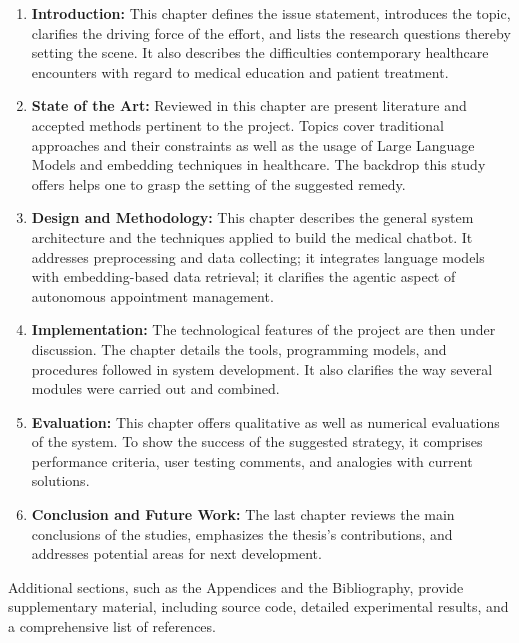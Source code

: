 \begin{enumerate}[itemsep=2em]
    \item \textbf{Introduction:} This chapter defines the issue statement, introduces the topic, clarifies the driving force of the effort, and lists the research questions thereby setting the scene. It also describes the difficulties contemporary healthcare encounters with regard to medical education and patient treatment.
    
    \item \textbf{State of the Art:} Reviewed in this chapter are present literature and accepted methods pertinent to the project. Topics cover traditional approaches and their constraints as well as the usage of Large Language Models and embedding techniques in healthcare. The backdrop this study offers helps one to grasp the setting of the suggested remedy.
    
    \item \textbf{Design and Methodology:} This chapter describes the general system architecture and the techniques applied to build the medical chatbot. It addresses preprocessing and data collecting; it integrates language models with embedding-based data retrieval; it clarifies the agentic aspect of autonomous appointment management.
    
    \item \textbf{Implementation:} The technological features of the project are then under discussion. The chapter details the tools, programming models, and procedures followed in system development. It also clarifies the way several modules were carried out and combined.
    
    \item \textbf{Evaluation:} This chapter offers qualitative as well as numerical evaluations of the system. To show the success of the suggested strategy, it comprises performance criteria, user testing comments, and analogies with current solutions.
    
    \item \textbf{Conclusion and Future Work:} The last chapter reviews the main conclusions of the studies, emphasizes the thesis's contributions, and addresses potential areas for next development.
\end{enumerate}

Additional sections, such as the Appendices and the Bibliography, provide supplementary material, including source code, detailed experimental results, and a comprehensive list of references.
